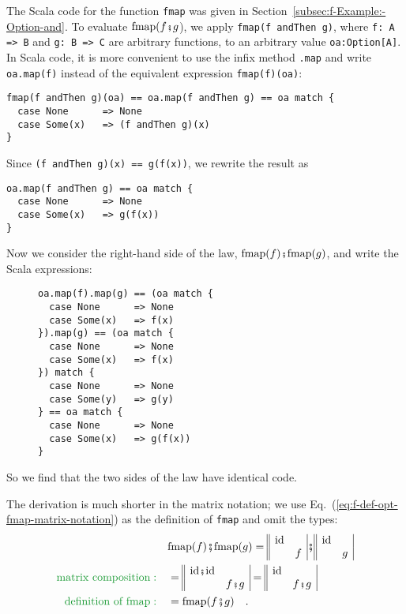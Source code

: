 The Scala code for the function \lstinline!fmap! was given in Section~\ref{subsec:f-Example:-Option-and}.
To evaluate $\text{fmap}(f\bef g$), we apply \lstinline!fmap(f andThen g)!,
where \lstinline!f: A => B! and \lstinline!g: B => C! are arbitrary
functions, to an arbitrary value \lstinline!oa:Option[A]!. In Scala
code, it is more convenient to use the infix method \lstinline!.map!
and write \lstinline!oa.map(f)! instead of the equivalent expression
\lstinline!fmap(f)(oa)!:
\begin{lstlisting}
fmap(f andThen g)(oa) == oa.map(f andThen g) == oa match {
  case None      => None
  case Some(x)   => (f andThen g)(x)
}
\end{lstlisting}
Since \lstinline!(f andThen g)(x) == g(f(x))!, we rewrite the result
as
\begin{lstlisting}
oa.map(f andThen g) == oa match {
  case None      => None
  case Some(x)   => g(f(x))
}
\end{lstlisting}
Now we consider the right-hand side of the law, $\text{fmap}(f)\bef\text{fmap}(g)$,
and write the Scala expressions:

\begin{wrapfigure}{l}{0.33\columnwidth}%
\vspace{-0.8\baselineskip}
\begin{lstlisting}
oa.map(f).map(g) == (oa match {
  case None      => None
  case Some(x)   => f(x)
}).map(g) == (oa match {
  case None      => None
  case Some(x)   => f(x)
}) match {
  case None      => None
  case Some(y)   => g(y)
} == oa match {
  case None      => None
  case Some(x)   => g(f(x))
}
\end{lstlisting}
\vspace{-7\baselineskip}
\end{wrapfigure}%
So we find that the two sides of the law have identical code.

The derivation is much shorter in the matrix notation; we use Eq.~(\ref{eq:f-def-opt-fmap-matrix-notation})
as the definition of \lstinline!fmap! and omit the types:
\begin{align*}
 & \text{fmap}(f)\bef\text{fmap}(g)=\begin{array}{||cc|}
\text{id} & \\
 & f
\end{array}\bef\begin{array}{||cc|}
\text{id} & \\
 & g
\end{array}\\
{\color{greenunder}\text{matrix composition}:}\quad & =\begin{array}{||cc|}
\text{id}\bef\text{id} & \\
 & f\bef g
\end{array}=\begin{array}{||cc|}
\text{id} & \\
 & f\bef g
\end{array}\\
{\color{greenunder}\text{definition of fmap}:}\quad & =\text{fmap}(f\bef g)\quad.
\end{align*}

